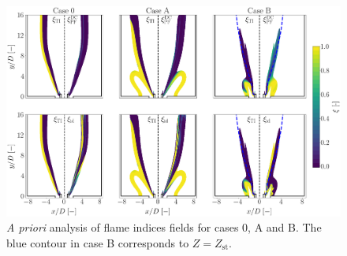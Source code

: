 \documentclass[preprint,12pt,authoryear]{elsarticle}
\begin{document}
{\clearpage













\begin{figure}[h!]
    \hspace{-0.5in}
	\includegraphics[scale=0.25]{./figures/FR_maps_a_priori_zetas}
	\caption{\textsl{A priori} analysis of flame indices fields for cases 0, A and B. The blue contour in case B corresponds to $Z = Z_\mathrm{st}$.}
	\label{fig:FR_maps_a_priori_zetas}
\end{figure}

}
\end{document}
